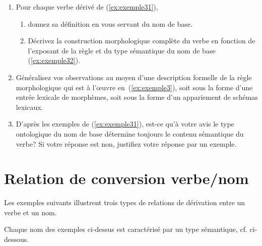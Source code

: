 \begin{enumerate}
\item Pour chaque verbe dérivé de (\ref{ex:exemple31}), 
	\begin{enumerate}
	\item donnez sa  définition en vous servant du nom de base.
	\item Décrivez la construction morphologique complète du verbe en fonction de l'exposant de la règle et du type sémantique du nom de base (\ref{ex:exemple32}).
	\end{enumerate}   
\item Généralisez vos observations au moyen d'une description formelle de la règle morphologique qui est à l'œuvre en~(\ref{ex:exemple3}), soit sous la forme d'une entrée lexicale de morphèmes, soit sous la forme d'un appariement de schémas lexicaux.
\item D'après les exemples de (\ref{ex:exemple31}), est-ce qu'à votre avis le type ontologique du nom de base détermine toujours le contenu sémantique du verbe? Si votre réponse est non, justifiez votre réponse par un exemple. 

\end{enumerate}



\section{Relation de conversion verbe/nom}

Les exemples suivants illustrent trois types de relations de dérivation entre un verbe et un nom. 

\vspace{-.5\baselineskip}
\begin{exe}
\ex \label{ex:exemple41}\begin{xlist}
\ex \zigzaguerexquatre  
\ex  \vitriolerexquatre
\ex \ventriloquerexquatre
\end{xlist}
\end{exe}

Chaque nom des exemples ci-dessus est caractérisé par un type sémantique, cf. ci-dessous.


\vspace{-.5\baselineskip}
\begin{exe}
\ex \label{ex:exemple42} \begin{xlist}
\ex \zigzagexquatrebis
\ex \vitriolexquatrebis
\ex \label{ex:exemple4} \ventriloqueexquatrebis
\end{xlist}
\end{exe}


